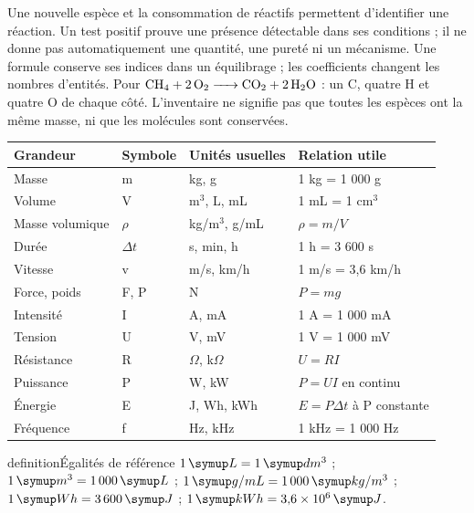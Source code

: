 Une nouvelle espèce et la consommation de réactifs permettent d’identifier une réaction. Un test positif prouve une présence détectable dans ses conditions ; il ne donne pas automatiquement une quantité, une pureté ni un mécanisme. Une formule conserve ses indices dans un équilibrage ; les coefficients changent les nombres d’entités.
Pour $\ce{CH4 + 2O2 -> CO2 + 2H2O}$ : un C, quatre H et quatre O de chaque côté. L’inventaire ne signifie pas que toutes les espèces ont la même masse, ni que les molécules sont conservées.
\begin{tabularx}{\linewidth}{@{}p{26mm}p{16mm}YY@{}}\toprule
Grandeur & Symbole & Unités usuelles & Relation utile\\\midrule
Masse & m & kg, g & 1 kg = 1 000 g\\[2mm]
Volume & V & m$^3$, L, mL & 1 mL = 1 cm$^3$\\[2mm]
Masse volumique & $\rho$ & kg/m$^3$, g/mL & $\rho=m/V$\\[2mm]
Durée & $\Delta t$ & s, min, h & 1 h = 3 600 s\\[2mm]
Vitesse & v & m/s, km/h & 1 m/s = 3,6 km/h\\[2mm]
Force, poids & F, P & N & $P=mg$\\[2mm]
Intensité & I & A, mA & 1 A = 1 000 mA\\[2mm]
Tension & U & V, mV & 1 V = 1 000 mV\\[2mm]
Résistance & R & $\Omega$, k$\Omega$ & $U=RI$\\[2mm]
Puissance & P & W, kW & $P=UI$ en continu\\[2mm]
Énergie & E & J, Wh, kWh & $E=P\Delta t$ à P constante\\[2mm]
Fréquence & f & Hz, kHz & 1 kHz = 1 000 Hz\\\bottomrule
\end{tabularx}
\begin{pcEncadre}{definition}{Égalités de référence}
$1\unite L=1\unite{dm^3}$ ; $1\unite{m^3}=1\,000\unite L$ ; $1\unite{g/mL}=1\,000\unite{kg/m^3}$ ; $1\unite{Wh}=3\,600\unite J$ ; $1\unite{kWh}=3{,}6\times10^6\unite J$.
\end{pcEncadre}
\label{cor-diagnostic}
